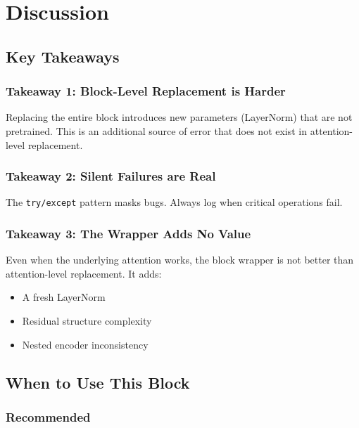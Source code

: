 
\section{Discussion}

\subsection{Key Takeaways}

\subsubsection{Takeaway 1: Block-Level Replacement is Harder}

Replacing the entire block introduces new parameters (LayerNorm) that are 
not pretrained. This is an additional source of error that does not exist 
in attention-level replacement.

\subsubsection{Takeaway 2: Silent Failures are Real}

The \texttt{try/except} pattern masks bugs. Always log when critical operations 
fail.

\subsubsection{Takeaway 3: The Wrapper Adds No Value}

Even when the underlying attention works, the block wrapper is not better 
than attention-level replacement. It adds:
\begin{itemize}
\item A fresh LayerNorm
\item Residual structure complexity
\item Nested encoder inconsistency

\end{itemize}
\subsection{When to Use This Block}

\subsubsection{Recommended}

